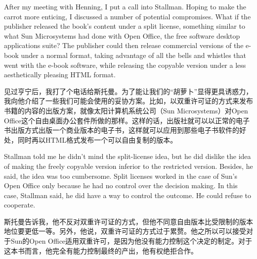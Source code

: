 \ifdefined\eng
After my meeting with Henning, I put a call into Stallman. Hoping to make the carrot more enticing, I discussed a number of potential compromises. What if the publisher released the book's content under a split license, something similar to what Sun Microsystems had done with Open Office, the free software desktop applications suite? The publisher could then release commercial %
versions of the e-book under a normal %
format, taking advantage of all the bells and whistles that went with the e-book software, while releasing the copyable version under a less aesthetically pleasing HTML format.
\fi

\ifdefined\chs
见过亨宁后，我打了个电话给斯托曼。为了能让我们的“胡萝卜”显得更具诱惑力，我向他介绍了一些我们可能会使用的妥协方案。比如，以双重许可证的方式来发布书籍的内容的出版方案，就像太阳计算机系统公司（Sun Microsystems）对Open Office这个自由桌面办公套件所做的那样。这样的话，出版社就可以以正常的电子书出版方式出版一个商业版本的电子书，这样就可以应用到那些电子书软件的好处，同时再以HTML格式发布一个可以自由复制的版本。
\fi

\ifdefined\eng
Stallman told me he didn't mind the split-license idea, but he did dislike the idea of making the freely copyable version inferior to the restricted version. Besides, he said, the idea was too cumbersome. Split licenses worked in the case of Sun's Open Office only because he had no control over the decision making. In this case, Stallman said, he did have a way to control the outcome. He could refuse to cooperate.
\fi

\ifdefined\chs
斯托曼告诉我，他不反对双重许可证的方式，但他不同意自由版本比受限制的版本地位要更低一等。另外，他说，双重许可证的方式过于累赘。他之所以可以接受对于Sun的Open Office适用双重许可，是因为他没有能力控制这个决定的制定。对于这本书而言，他完全有能力控制最终的产出，他有权绝拒合作。
\fi


